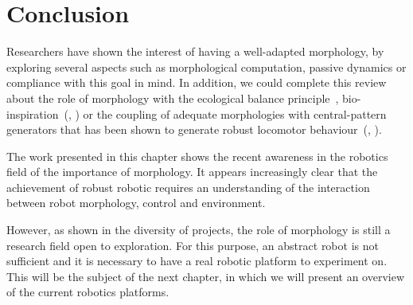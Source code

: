 \section{Conclusion} %

Researchers have shown the interest of having a well-adapted morphology, by exploring several aspects such as morphological computation, passive dynamics or compliance with this goal in mind. In addition, we could complete this review about the role of morphology with the ecological balance principle~\parencite{pfeifer2005new}, bio-inspiration~(\cite{scarfogliero2009use}, \cite{Pfeifer07}) or the coupling of adequate morphologies with central-pattern generators that has been shown to generate robust locomotor behaviour~(\cite{ijspeert2007swimming}, \cite{steingrube2010self}).

The work presented in this chapter shows the recent awareness in the robotics field of the importance of morphology. It appears increasingly clear that the achievement of robust robotic requires an understanding of the interaction between robot morphology, control and environment.

However, as shown in the diversity of projects, the role of morphology is still a research field open to exploration. For this purpose, an abstract robot is not sufficient and it is necessary to have a real robotic platform to experiment on. This will be the subject of the next chapter, in which we will present an overview of the current robotics platforms.


